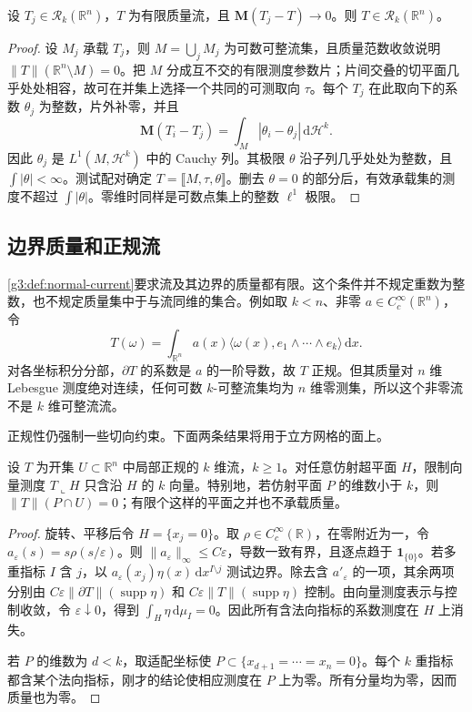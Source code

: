 \begin{lemma}\label{g3:lem:integer-rectifiable-mass-closure}
	设 \(T_j\in\mathcal R_k(\mathbb R^n)\)，\(T\) 为有限质量流，且 \(\mathbf M(T_j-T)\to0\)。则 \(T\in\mathcal R_k(\mathbb R^n)\)。
\end{lemma}
\begin{proof}
	设 \(M_j\) 承载 \(T_j\)，则 \(M=\bigcup_jM_j\) 为可数可整流集，且质量范数收敛说明 \(\|T\|(\mathbb R^n\setminus M)=0\)。把 \(M\) 分成互不交的有限测度参数片；片间交叠的切平面几乎处处相容，故可在并集上选择一个共同的可测取向 \(\tau\)。每个 \(T_j\) 在此取向下的系数 \(\theta_j\) 为整数，片外补零，并且
	\[
		\mathbf M(T_i-T_j)=\int_M|\theta_i-\theta_j|\,\mathrm d\mathcal H^k.
	\]
	因此 \(\theta_j\) 是 \(L^1(M,\mathcal H^k)\) 中的 Cauchy 列。其极限 \(\theta\) 沿子列几乎处处为整数，且 \(\int|\theta|<\infty\)。测试配对确定 \(T=\lBrack M,\tau,\theta\rBrack\)。删去 \(\theta=0\) 的部分后，有效承载集的测度不超过 \(\int|\theta|\)。零维时同样是可数点集上的整数 \(\ell^1\) 极限。
\end{proof}

\subsection{边界质量和正规流}
\label{g3:subsec:2202:02}
\cref{g3:def:normal-current}要求流及其边界的质量都有限。这个条件并不规定重数为整数，也不规定质量集中于与流同维的集合。例如取 \(k<n\)、非零 \(a\in C_c^\infty(\mathbb R^n)\)，令
\[
	T(\omega)=\int_{\mathbb R^n}a(x)\langle\omega(x),e_1\wedge\cdots\wedge e_k\rangle\,\mathrm dx.
\]
对各坐标积分分部，\(\partial T\) 的系数是 \(a\) 的一阶导数，故 \(T\) 正规。但其质量对 \(n\) 维 Lebesgue 测度绝对连续，任何可数 \(k\)-可整流集均为 \(n\) 维零测集，所以这个非零流不是 \(k\) 维可整流流。

正规性仍强制一些切向约束。下面两条结果将用于立方网格的面上。

\begin{lemma}\label{g3:lem:normal-current-no-lower-skeleton}
	设 \(T\) 为开集 \(U\subset\mathbb R^n\) 中局部正规的 \(k\) 维流，\(k\ge1\)。对任意仿射超平面 \(H\)，限制向量测度 \(T\llcorner H\) 只含沿 \(H\) 的 \(k\) 向量。特别地，若仿射平面 \(P\) 的维数小于 \(k\)，则 \(\|T\|(P\cap U)=0\)；有限个这样的平面之并也不承载质量。
\end{lemma}
\begin{proof}
	旋转、平移后令 \(H=\{x_j=0\}\)。取 \(\rho\in C_c^\infty(\mathbb R)\)，在零附近为一，令 \(a_\varepsilon(s)=s\rho(s/\varepsilon)\)。则 \(\|a_\varepsilon\|_\infty\le C\varepsilon\)，导数一致有界，且逐点趋于 \(\mathbf1_{\{0\}}\)。若多重指标 \(I\) 含 \(j\)，以
	\(a_\varepsilon(x_j)\eta(x)\,\mathrm dx^{I\setminus j}\)
	测试边界。除去含 \(a'_\varepsilon\) 的一项，其余两项分别由 \(C\varepsilon\|\partial T\|(\operatorname{supp}\eta)\) 和 \(C\varepsilon\|T\|(\operatorname{supp}\eta)\) 控制。由向量测度表示与控制收敛，令 \(\varepsilon\downarrow0\)，得到 \(\int_H\eta\,\mathrm d\mu_I=0\)。因此所有含法向指标的系数测度在 \(H\) 上消失。

	若 \(P\) 的维数为 \(d<k\)，取适配坐标使 \(P\subset\{x_{d+1}=\cdots=x_n=0\}\)。每个 \(k\) 重指标都含某个法向指标，刚才的结论使相应测度在 \(P\) 上为零。所有分量均为零，因而质量也为零。
\end{proof}

